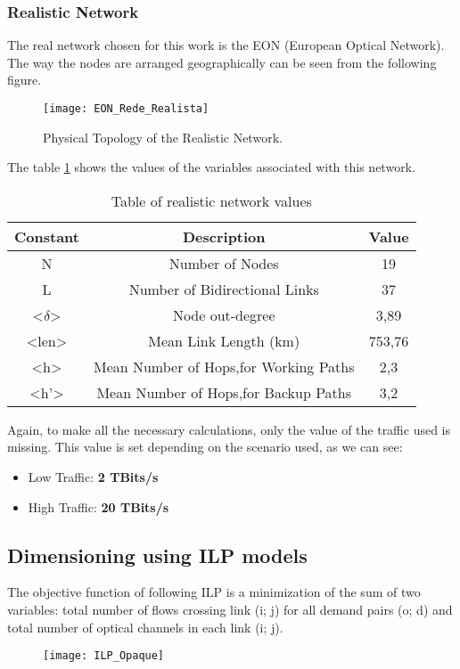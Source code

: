 \subsubsection{Realistic Network}
The real network chosen for this work is the EON (European Optical Network).
The way the nodes are arranged geographically can be seen from the following figure.

\begin{figure}[h!]
\centering
\texttt{[image: EON\_Rede\_Realista]}
\caption{Physical Topology of the Realistic Network.}
\end{figure}

The table \ref{table:2} shows the values of the variables associated with this network.
\begin{table}[h!]
\centering
\begin{tabular}{|| c | c | c||}
 \hline
 Constant & Description & Value \\
 \hline\hline
 N & Number of Nodes & 19 \\
 L & Number of Bidirectional Links & 37 \\
 <$\delta$> & Node out-degree & 3,89 \\
 <len> & Mean Link Length (km) & 753,76 \\
 <h> & Mean Number of Hops,for Working Paths & 2,3 \\
 <h'> & Mean Number of Hops,for Backup Paths & 3,2 \\
 \hline
\end{tabular}
\caption{Table of realistic network values}
\label{table:2}
\end{table}

Again, to make all the necessary calculations, only the value of the traffic used is missing. This value is set depending on the scenario used, as we can see:

\begin{itemize}
  \item Low Traffic: \textbf{2 TBits/s}
  \item High Traffic: \textbf{20 TBits/s}
\end{itemize}

\subsection{Dimensioning using ILP models}

The objective function of following ILP is a minimization of the sum of two variables: total number of flows crossing link (i; j) for all demand pairs (o; d) and total number of optical channels in each link (i; j).
\begin{figure}[h!]
  \centering
  \texttt{[image: ILP\_Opaque]}
\end{figure}

